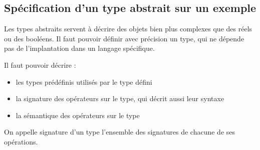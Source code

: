 \documentclass[../../../main.tex]{subfiles}
\begin{document}
\subsection{Spécification d'un type abstrait sur un exemple}
Les types abstraits servent à décrire des objets bien plus complexes que des réels ou des booléens. Il faut pouvoir définir avec précision un type, qui ne dépende pas de l'implantation dans un langage spécifique.

Il faut pouvoir décrire :
\begin{itemize}
	\item les types prédéfinis utilisés par le type défini
	\item la signature des opérateurs sur le type, qui décrit aussi leur syntaxe
	\item la sémantique des opérateurs sur le type
\end{itemize}
On appelle signature d'un type l'ensemble des signatures de chacune de ses opérations.
\end{document}
